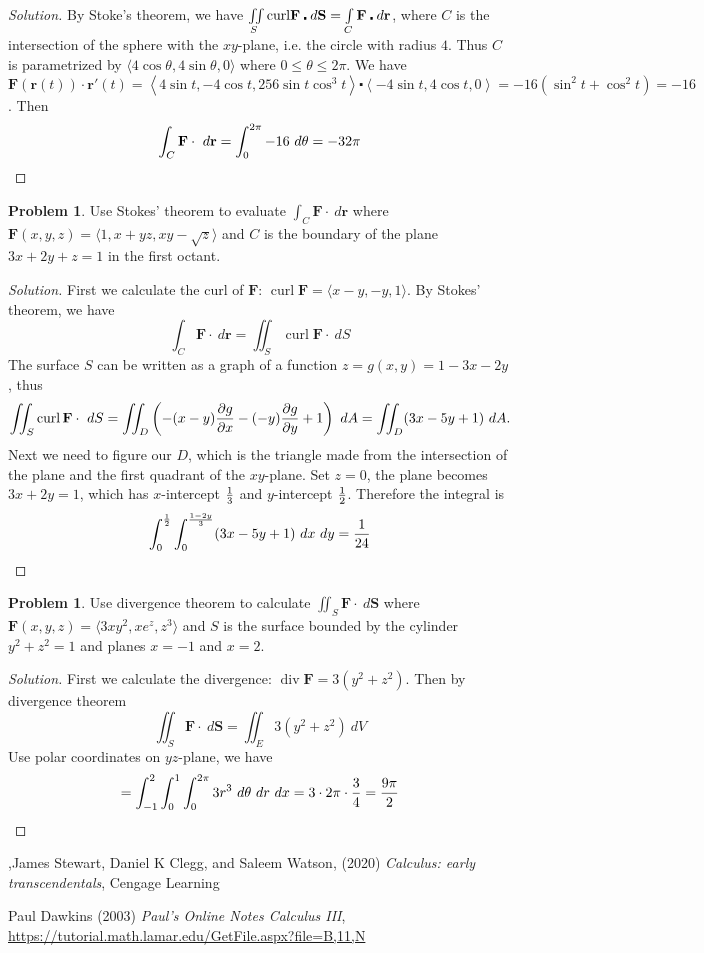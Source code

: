 \documentclass[12pt]{amsart}%
\theoremstyle{plain}
\theoremstyle{definition}
\newtheorem{prob}[theorem]{Problem}
\theoremstyle{special}
\newcommand{\sol}[1]{
{\begin{proof}[Solution]#1\end{proof}}
}
\newcommand{\Prob}[1]{\begin{tcolorbox}%
\begin{prob}
	#1
\end{prob}
\end{tcolorbox}	
}
\renewcommand{\vec}{\mathbf}
\DeclareMathOperator{\cur}{curl}
\DeclareMathOperator{\Div}{div}
\begin{document}
{
\sol{By Stoke's theorem, we have $\iint\limits_{S}{{{\mathop{\rm curl}\nolimits} \vec F\centerdot d\vec S}} = \int\limits_{C}{{\vec F\centerdot d\vec r}}$, where $C$ is the intersection of the sphere with the $xy$-plane, i.e. the circle with radius $4$. Thus $C$ is parametrized by
\(\langle 4\cos \theta,4\sin\theta,0\rangle\) where \(0\leq \theta\leq 2\pi \).
We have
$\vec F\left( {\vec r\left( t \right)} \right)\cdot \vec r'\left( t \right)  = \left\langle {4\sin t, - 4\cos t,256\sin t{{\cos }^3}t} \right\rangle \centerdot \left\langle { - 4\sin t,4\cos t,0} \right\rangle   =  - 16({\sin ^2}t+{\cos ^2}t)  =  - 16$. 
Then \[\int_C \vec F\cdot \ d\vec r=\int_0^{2\pi}-16\ d\theta=-32\pi\qedhere\]
}}
\Prob{Use Stokes' theorem to evaluate $\int_C \vec F\cdot\ d\vec r $ where $\vec F(x,y,z)=\langle 1,x+yz,xy-\sqrt{z} \rangle $ and $C$ is the boundary of the plane $3x+2y+z=1$ in the first octant.}
{
\sol{First we calculate the curl of $\vec F$:
\(\cur \vec F=\langle x-y,-y,1\rangle\). By Stokes' theorem, we have
\[\int_C \vec F\cdot\ d\vec r =\iint_S\cur \vec F\cdot\ d S\]
The surface $S$ can be written as a graph of a function $z=g(x,y)=1-3x-2y$, thus
\[\iint_S\cur \vec F\cdot\ d S=\iint_D\left(-(x-y){\partial g\over\partial x}-(-y){\partial g\over\partial y}+1 \right)\ dA=\iint_D(3x-5y+1)\ dA.\]
Next we need to figure our $D$, which is the triangle made from the intersection of the plane and the first quadrant of the $xy$-plane. Set $z=0$, the plane becomes $3x+2y=1$, which has $x$-intercept ${1\over 3}$ and $y$-intercept $1\over 2$. Therefore the integral is
\[\int_0^{1\over 2}\int_{0}^{{1-2y}\over 3}(3x-5y+1)\ dx\ dy={1\over 24}\qedhere\]
}}
\Prob{Use divergence theorem to calculate $\iint_S \vec F\cdot\ d \vec S$ where $\vec F(x,y,z)=\langle 3xy^2,xe^z,z^3\rangle$ and $S$ is the surface bounded by the cylinder $y^2+z^2=1$ and planes $x=-1$ and $x=2$.}

\sol{First we calculate the divergence: $\Div\vec F= 3(y^2+z^2)$. Then by divergence theorem
\[\iint_S\vec F\cdot\ d\vec S=\iint_E3(y^2+z^2)\ dV\]
Use polar coordinates on $yz$-plane, we have
\[=\int_{-1}^2\int_0^1\int_0^{2\pi}3r^3\ d\theta\ dr\ dx=3\cdot 2\pi\cdot {3\over 4}={9\pi\over 2}\qedhere \]
}
\newpage
\begin{thebibliography}{9}
,James Stewart, Daniel K Clegg, and Saleem Watson, (2020) \emph{Calculus: early transcendentals}, Cengage Learning

Paul Dawkins (2003) \emph{Paul's Online Notes Calculus III}, \url{https://tutorial.math.lamar.edu/GetFile.aspx?file=B,11,N}
\end{thebibliography}
\end{document}
